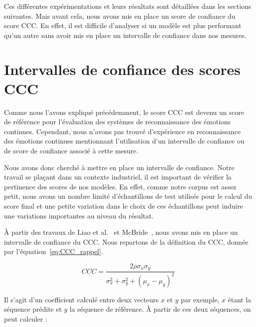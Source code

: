 Ces différentes expérimentations et leurs résultats sont détaillées dans les sections suivantes. Mais avant cela, nous avons mis en place un score de confiance du score CCC. En effet, il est difficile d'analyser si un modèle est plus performant qu'un autre sans avoir mis en place un intervalle de confiance dans nos mesures.

\section{Intervalles de confiance des scores CCC}
Comme nous l'avons expliqué précédemment, le score CCC est devenu un score de référence pour l'évaluation des systèmes de reconnaissance des émotions continues. %
Cependant, nous n'avons pas trouvé d'expérience en reconnaissance des émotions continues  mentionnant l'utilisation d'un intervalle de confiance ou de score de confiance associé à cette mesure.

Nous avons donc cherché à mettre en place un intervalle de confiance. Notre travail se plaçant dans un contexte industriel, il est important de vérifier la pertinence des scores de nos modèles. En effet, comme notre corpus est assez petit, nous avons un nombre limité d'échantillons de test utilisés pour le calcul du score final et une petite variation dans le choix de ces échantillons peut induire une variations importantes au niveau du résultat.

À partir des travaux de Liao et al.~\cite{Liao2000} et McBride~\cite{McBride2005}, nous avons mis en place un intervalle de confiance du CCC. Nous repartons de la définition du CCC, donnée par l'équation~\ref{eq:CCC_rappel}.

\begin{equation}
   CCC = \frac{2\rho\sigma_x\sigma_y}{\sigma_x^2 + \sigma_y^2 + (\mu_x - \mu_y)^2}
\label{eq:CCC_rappel}
\end{equation}

Il s'agit d'un coefficient calculé entre deux vecteurs $x$ et $y$ par exemple, $x$ étant la séquence prédite et $y$ la séquence de référence.
À partir de ces deux séquences, on peut calculer :

